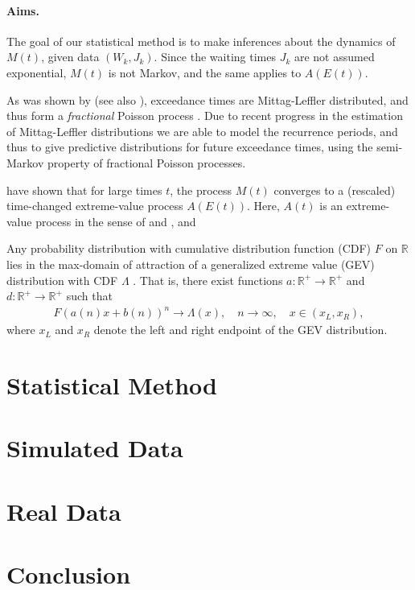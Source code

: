 \documentclass[12pt]{article}
\theoremstyle{definition}
\theoremstyle{remark}
\numberwithin{equation}{section}
\newcommand{\R}{\mathbb R}
\newcommand{\Rp}{\mathbb R^+}
\newcommand{\1}{\mathbf 1}
\begin{document}
\paragraph*{Aims.}
The goal of our statistical method is to make inferences about the dynamics
of $M(t)$, given data $(W_k, J_k)$. 
Since the waiting times $J_k$ are not assumed exponential, $M(t)$ is not Markov,
and the same applies to $A(E(t))$.  



As was shown by \cite{Anderson1987} (see also 
\cite{MeerschaertStoev08}), exceedance times are
Mittag-Leffler distributed, and thus form a \emph{fractional} Poisson process
\cite{Laskin2003}. Due to recent progress in the estimation of Mittag-Leffler
distributions \cite{Cahoy2013,Cahoy2010} we are able to model the recurrence
periods, and thus to give predictive distributions for future exceedance times,
using the semi-Markov property of fractional Poisson processes.



\cite{MeerschaertStoev08} have shown that for large times $t$, 
the process $M(t)$ converges to a (rescaled) time-changed 
extreme-value process $A(E(t))$. 
Here, $A(t)$ is an extreme-value process in the sense of \cite{Lamperti1964}
and \cite{resnick2013extreme}, and 









Any probability distribution with cumulative distribution
function (CDF) $F$ on $\R$ lies in the max-domain of attraction
of a generalized extreme value (GEV) distribution with CDF $\Lambda$
\cite{beirlant06Book}.
That is, there exist
functions $a: \Rp \to \Rp$ and $d: \Rp \to \Rp$ such that
\begin{align}
F(a(n) x + b(n))^n \to \Lambda(x), \quad n \to \infty, \quad x \in (x_L, x_R),
\end{align}
where $x_L$ and $x_R$ denote the left and right endpoint of the GEV distribution.



\section{Statistical Method}

\section{Simulated Data}

\section{Real Data}

\section{Conclusion}




\end{document}
